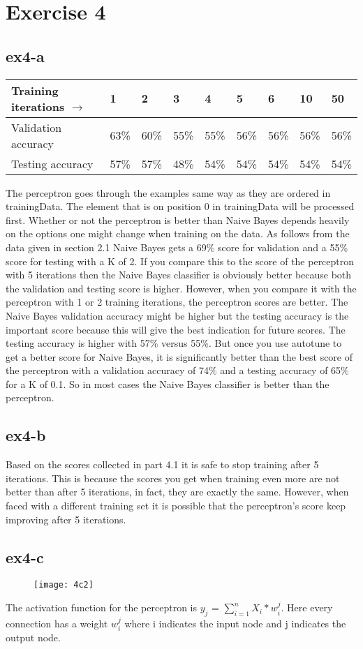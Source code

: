 \section{Exercise 4}
\subsection{ex4-a}
\begin{table}[]
\begin{tabular}{|l||l|l|l|l|l|l|l|l|}
\hline
Training iterations $\rightarrow$  & 1   & 2 & 3 & 4 & 5 & 6 & 10 & 50 \\ \hline
Validation accuracy  & 63\% & 60\% & 55\% & 55\% & 56\% & 56\% & 56\% & 56\% \\ 
Testing accuracy    & 57\% & 57\% & 48\% & 54\% & 54\% & 54\% & 54\% & 54\% \\ \hline
\end{tabular}
\end{table}
The perceptron goes through the examples same way as they are ordered in trainingData. 
The element that is on position 0 in trainingData will be processed first.
Whether or not the perceptron is better than Naive Bayes depends heavily on the options 
one might change when training on the data. As follows from the data given in section 2.1 
Naive Bayes gets a 69\% score for validation and a 55\% score for testing with a K of 2. 
If you compare this to the score of the perceptron with 5 iterations then the Naive Bayes 
classifier is obviously better because both the validation and testing score is higher.
However, when you compare it with the perceptron with 1 or 2 training iterations, the perceptron
scores are better. The Naive Bayes validation accuracy might be higher but the testing accuracy
is the important score because this will give the best indication for future scores. 
The testing accuracy is higher with 57\% versus 55\%.
But once you use autotune to get a better score for Naive Bayes, it is significantly better
than the best score of the perceptron with a validation accuracy of 74\% and a testing accuracy 
of 65\% for a K of 0.1. So in most cases the Naive Bayes classifier is better than the perceptron.

\subsection{ex4-b}
Based on the scores collected in part 4.1 it is safe to stop training after 5 iterations. 
This is because the scores you get when training even more are not better than after 5 iterations, 
in fact, they are exactly the same. However, when faced with a different training set it is 
possible that the perceptron's score keep improving after 5 iterations.

\subsection{ex4-c}
\begin{figure}[H]
\caption{}
\centering
\texttt{[image: 4c2]}
\end{figure}
The activation function for the perceptron is $y_j$ = $\sum_{i=1}^{n} X_i * w_i^j$. Here every 
connection has a weight $w_i^j$ where i indicates the input node and j indicates the output node.
